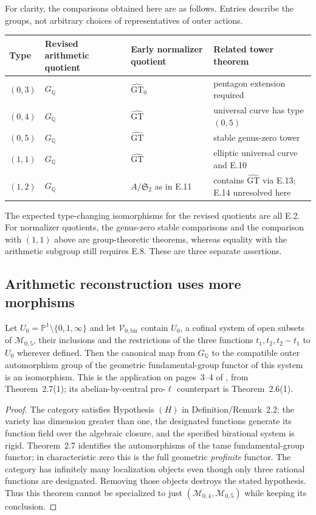 For clarity, the comparisons obtained here are as follows.  Entries
describe the groups, not arbitrary choices of representatives of outer
actions.
\begin{center}
\begin{tabular}{L{.13\linewidth}L{.24\linewidth}L{.25\linewidth}L{.27\linewidth}}
Type & Revised arithmetic quotient & Early normalizer quotient & Related tower theorem\\ \hline
$(0,3)$ & $G_{\mathbb Q}$ & $\widehat{\mathrm{GT}}_0$ & pentagon extension required\\
$(0,4)$ & $G_{\mathbb Q}$ & $\widehat{\mathrm{GT}}$ & universal curve has type $(0,5)$\\
$(0,5)$ & $G_{\mathbb Q}$ & $\widehat{\mathrm{GT}}$ & stable genus-zero tower\\
$(1,1)$ & $G_{\mathbb Q}$ & $\widehat{\mathrm{GT}}$ & elliptic universal curve and E.10\\
$(1,2)$ & $G_{\mathbb Q}$ & $A/\mathfrak S_2$ as in E.11 & contains $\widehat{\mathrm{GT}}$ via E.13; E.14 unresolved here\\
\end{tabular}
\end{center}
The expected type-changing isomorphisms for the revised quotients are
all E.2.  For normalizer quotients, the genus-zero stable comparisons and
the comparison with $(1,1)$ above are group-theoretic theorems, whereas
equality with the arithmetic subgroup still requires E.8.  These are
three separate assertions.

\subsection{Arithmetic reconstruction uses more morphisms}

Let $U_0=\mathbb P^1\setminus\{0,1,\infty\}$ and let
$\mathcal V_{0,\mathrm{bir}}$ contain $U_0$, a cofinal system of open
subsets of $\mathcal M_{0,5}$, their inclusions and the restrictions of
the three functions $t_1,t_2,t_2-t_1$ to $U_0$ wherever defined.
Then the canonical map from $G_{\mathbb Q}$ to the compatible outer
automorphism group of the geometric fundamental-group functor of this
system is an isomorphism.  This is the application on pages~3--4 of
\citet{Pop2018Tripod}, from Theorem~2.7(1); its abelian-by-central
pro-$\ell$ counterpart is Theorem~2.6(1).
\begin{proof}
The category satisfies Hypothesis $(H)$ in Definition/Remark~2.2:
the variety has dimension greater than one, the designated functions
generate its function field over the algebraic closure, and the specified
birational system is rigid.  Theorem~2.7 identifies the automorphisms
of the tame fundamental-group functor; in characteristic zero this is
the full geometric \emph{profinite} functor.  The category has infinitely
many localization objects even though only three rational functions are
designated.  Removing those objects destroys the stated hypothesis.
Thus this theorem cannot be specialized to just
$(\mathcal M_{0,4},\mathcal M_{0,5})$ while keeping its conclusion.
\end{proof}

